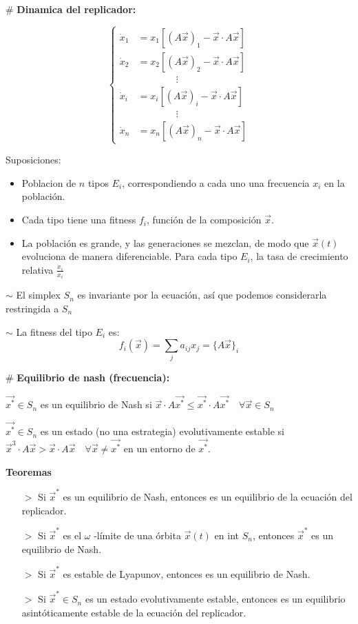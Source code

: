 \documentclass[%
 reprint,
 amsmath,amssymb,
 aps,
]{revtex4-1}
\begin{document}
$\#$ \textbf{Dinamica del replicador:}

$$ \left\lbrace
\begin{aligned}
  \dot{x}_{1} &= x_{1}\left[(A \vec{x})_{1}-\vec{x} \cdot A \vec{x}\right] \\
  \dot{x}_{2} &= x_{2}\left[(A \vec{x})_{2}-\vec{x} \cdot A \vec{x}\right] \\
  \ & \qquad \qquad \vdots \\ 
  \dot{x}_{i} &= x_{i}\left[(A \vec{x})_{i}-\vec{x} \cdot A \vec{x}\right] \\
  \ & \qquad \qquad \vdots \\ 
  \dot{x}_{n} &= x_{n}\left[(A \vec{x})_{n}-\vec{x} \cdot A \vec{x}\right]
\end{aligned}
\right.
$$

Suposiciones:
\begin{itemize}
  \item Poblacion de $n$ tipos $E_{i}$, correspondiendo a cada uno una frecuencia $x_{i}$ en la población.
  \item Cada tipo tiene una fitness $f_{i}$, función de la composición $\vec{x}$. 
  \item La población es grande, y las generaciones se mezclan, de modo que $\vec{x}(t)$ evoluciona de manera diferenciable. Para cada tipo $E_{i}$, la tasa de crecimiento relativa $\frac{\dot{x}_{i}}{x_{i}}$
\end{itemize}

$\sim$ El simplex $S_{n}$ es invariante por la ecuación, así que podemos considerarla restringida a $S_{n}$

$\sim$ La fitness del tipo $E_{i}$ es:
$$
f_{i}(\vec{x})=\sum_{j} a_{i j} x_{j}=\{A \vec{x}\}_{i}
$$

$\#$ \textbf{Equilibrio de nash (frecuencia):}

$\vec{x^{*}} \in S_{n}$ es un equilibrio de Nash si
$\vec{x} \cdot A \vec{x^{*}} \leqslant \vec{x^{*}} \cdot A \vec{x^{*}} \quad \forall \vec{x} \in S_{n}$

$\vec{x^{*}} \in S_{n}$ es un estado (no una estrategia) evolutivamente estable si
$\vec{x}^{3} \cdot A \vec{x}>\vec{x} \cdot A \vec{x} \quad \forall \vec{x} \neq \vec{x^{*}}$ en un entorno de $\vec{x^{*}}$.

 
\textbf{Teoremas}

\begin{itemize}
  \item[$>$] Si $\vec{x}^{*}$ es un equilibrio de Nash, entonces es un equilibrio de la ecuación del replicador.
  \item[$>$] Si $\vec{x}^{*}$ es el $\omega$ -límite de una órbita $\vec{x}(t)$ en int $S_{n}$, entonces $\vec{x}^{*}$ es un equilibrio de Nash.
  \item[$>$] Si $\vec{x}^{*}$ es estable de Lyapunov, entonces es un equilibrio de Nash.
  \item[$>$] Si $\vec{x}^{*} \in S_{n}$ es un estado evolutivamente estable, entonces es un equilibrio asintóticamente estable de la ecuación del replicador.
\end{itemize}
\end{document}
